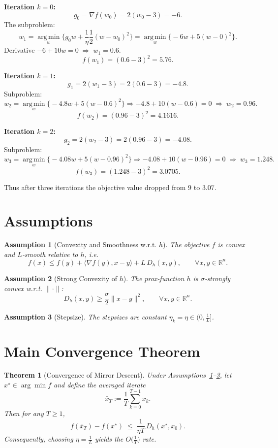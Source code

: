 \documentclass[11pt]{article}
\newtheorem{theorem}{Theorem}
\newtheorem{assumption}{Assumption}
\newcommand{\inner}[2]{\langle #1,#2\rangle}
\newcommand{\argmin}{\operatorname*{arg\,min}}
\newcommand{\grad}{\nabla}
\newcommand{\D}{D}
\newcommand{\R}{\mathbb{R}}
\begin{document}
\medskip
\noindent\textbf{Iteration $k=0$:}
\[
g_0=\grad f(w_0)=2(w_0-3)=-6.
\]
The subproblem:
\[
w_{1}=\argmin_{w}\Big\{ g_0 w+\frac{1}{\eta}\frac12 (w-w_0)^2\Big\}
       =\argmin_{w}\Big\{-6 w+5 (w-0)^2\Big\}.
\]
Derivative $-6+10w=0\;\Rightarrow\; w_1=0.6$.
\[
f(w_1)=(0.6-3)^2=5.76.
\]

\noindent\textbf{Iteration $k=1$:}
\[
g_1=2(w_1-3)=2(0.6-3)=-4.8.
\]
Subproblem:
\[
w_{2}=\argmin_{w}\Big\{-4.8 w+5 (w-0.6)^2\Big\}
\Longrightarrow -4.8+10(w-0.6)=0\;\Rightarrow\; w_2=0.96.
\]
\[
f(w_2)=(0.96-3)^2=4.1616.
\]

\noindent\textbf{Iteration $k=2$:}
\[
g_2=2(w_2-3)=2(0.96-3)=-4.08.
\]
Subproblem:
\[
w_{3}=\argmin_{w}\Big\{-4.08 w+5 (w-0.96)^2\Big\}
\Longrightarrow -4.08+10(w-0.96)=0\;\Rightarrow\; w_3=1.248.
\]
\[
f(w_3)=(1.248-3)^2=3.0705.
\]

Thus after three iterations the objective value dropped from $9$ to $3.07$.

\newpage
\section*{Assumptions}
\begin{assumption}[Convexity and Smoothness w.r.t. $h$]
\label{ass:convexsmooth}
The objective $f$ is convex and $L$‑smooth relative to $h$, i.e.
\[
f(x)\le f(y)+\inner{\grad f(y)}{x-y}+L\,\D_h(x,y),\qquad\forall x,y\in\R^{n}.
\tag{A1}
\]
\end{assumption}
\begin{assumption}[Strong Convexity of $h$]
\label{ass:hstrong}
The prox‑function $h$ is $\sigma$‑strongly convex w.r.t. $\|\cdot\|$:
\[
\D_h(x,y)\ge\frac{\sigma}{2}\|x-y\|^{2},\qquad\forall x,y\in\R^{n}.
\tag{A2}
\]
\end{assumption}
\begin{assumption}[Stepsize]
\label{ass:stepsize}
The stepsizes are constant $\eta_k=\eta\in\bigl(0,\frac{1}{L}\bigr]$.
\end{assumption}

\section*{Main Convergence Theorem}
\begin{theorem}[Convergence of Mirror Descent]
\label{thm:md}
Under Assumptions~\ref{ass:convexsmooth}–\ref{ass:stepsize}, let $x^{\star}\in\arg\min f$ and define the averaged iterate
\[
\bar x_T:=\frac{1}{T}\sum_{k=0}^{T-1}x_k .
\]
Then for any $T\ge1$,
\[
f(\bar x_T)-f(x^{\star})\;\le\;\frac{1}{\eta T}\,\D_h(x^{\star},x_0).
\tag{1}
\]
Consequently, choosing $\eta=\frac{1}{L}$ yields the $O\!\bigl(\frac{1}{T}\bigr)$ rate.
\end{theorem}
\end{document}
